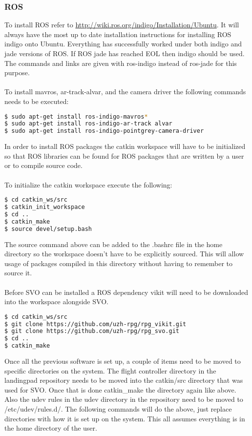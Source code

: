 \subsubsection{ROS}
To install ROS refer to \url{http://wiki.ros.org/indigo/Installation/Ubuntu}. It will always have the most up to date installation instructions for installing ROS indigo onto Ubuntu. Everything has successfully worked under both indigo and jade versions of ROS. If ROS jade has reached EOL then indigo should be used. The commands and links are given with ros-indigo instead of ros-jade for this purpose.\\
\\ 
To install mavros, ar-track-alvar, and the camera driver the following commands needs to be executed:
\begin{lstlisting}[language=bash]
$ sudo apt-get install ros-indigo-mavros*
$ sudo apt-get install ros-indigo-ar-track alvar
$ sudo apt-get install ros-indigo-pointgrey-camera-driver
\end{lstlisting}
In order to install ROS packages the catkin workspace will have to be initialized so that ROS libraries can be found for ROS packages that are written by a user or to compile source code. \\
\\
To initialize the catkin workspace execute the following:
\begin{lstlisting}[language=bash]
$ cd catkin_ws/src
$ catkin_init_workspace
$ cd ..
$ catkin_make
$ source devel/setup.bash
\end{lstlisting}
The source command above can be added to the .bashrc file in the home directory so the workspace doesn't have to be explicitly sourced. This will allow usage of packages compiled in this directory without having to remember to source it. \\
\\
Before SVO can be installed a ROS dependency vikit will need to be downloaded into the workspace alongside SVO.
\begin{lstlisting}[language=bash]
$ cd catkin_ws/src
$ git clone https://github.com/uzh-rpg/rpg_vikit.git
$ git clone https://github.com/uzh-rpg/rpg_svo.git
$ cd ..
$ catkin_make
\end{lstlisting}
Once all the previous software is set up, a couple of items need to be moved to specific directories on the system. The flight controller directory in the landingpad repository needs to be moved into the catkin/src directory that was used for SVO. Once that is done catkin\_make the directory again like above. Also the udev rules in the udev directory in the repository need to be moved to /etc/udev/rules.d/. The following commands will do the above, just replace directories with how it is set up on the system. This all assumes everything is in the home directory of the user. 
